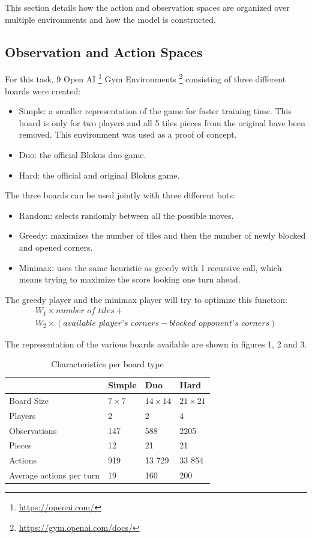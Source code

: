 \documentclass{article}
\begin{document}
This section details how the action and observation spaces are organized over multiple environments and how the model is constructed.

\subsection{Observation and Action Spaces}

For this task, 9 Open AI \footnote{\url{https://openai.com/}} Gym Environments \footnote{\url{https://gym.openai.com/docs/}} consisting of three different boards were created:
\begin{itemize}
\item Simple: a smaller representation of the game for faster training time. This board is only for two players and all 5 tiles pieces from the original have been removed. This environment was used as a proof of concept.
\item Duo: the official Blokus duo game.
\item Hard: the official and original Blokus game.
\end{itemize}

The three boards can be used jointly with three different bots: 
\begin{itemize}
\item Random: selects randomly between all the possible moves.
\item Greedy: maximizes the number of tiles and then the number of newly blocked and opened corners.
\item Minimax: uses the same heuristic as greedy with 1 recursive call, which means trying to maximize the score looking one turn ahead.
\end{itemize}

The greedy player and the minimax player will try to optimize this function:
\begin{equation}
\begin{array}{l}
W_1 \times \textit{number of tiles} + \\
W_2 \times (\textit{available player's corners} - \textit{blocked opponent's corners})
\end{array}
\label{formula:score}
\end{equation}

The representation of the various boards available are shown in figures 1, 2 and 3.
\begin{table}[H]
\centering
\begin{tabular}{llll}
\hline
 & Simple & Duo & Hard \\
\hline
Board Size & $7\times7$ & $14\times14$ & $21\times21$ \\
Players & 2 & 2 & 4 \\
Observations & 147 & 588 & 2205 \\
Pieces & 12 & 21 & 21 \\
Actions & 919 & 13 729 & 33 854 \\
Average actions per turn & 19 & 160 & 200 \\
\hline
\end{tabular}
\caption{Characteristics per board type}
\label{tab:boards}
\end{table}
\end{document}
